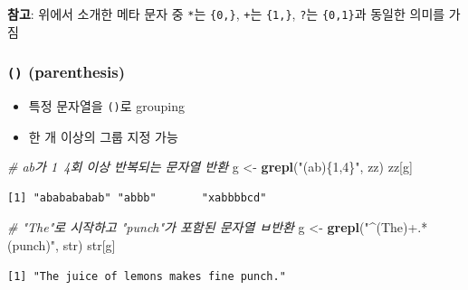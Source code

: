 \documentclass[
  11pt,
]{krantz}
\makeatletter
\newenvironment{Shaded}{\begin{snugshade}}{\end{snugshade}}
\newcommand{\CommentTok}[1]{\textcolor[rgb]{0.37,0.37,0.37}{\textit{#1}}}
\newcommand{\KeywordTok}[1]{\textcolor[rgb]{0.27,0.27,0.27}{\textbf{#1}}}
\newcommand{\NormalTok}[1]{#1}
\newcommand{\StringTok}[1]{\textcolor[rgb]{0.5,0.5,0.5}{#1}}
\providecommand{\tightlist}{%
  \setlength{\itemsep}{0pt}\setlength{\parskip}{0pt}}
\newenvironment{kframe}{%
\medskip{}
\setlength{\fboxsep}{.8em}
 \def\at@end@of@kframe{}%
 \ifinner\ifhmode%
  \def\at@end@of@kframe{\end{minipage}}%
  \begin{minipage}{\columnwidth}%
 \fi\fi%
 \def\FrameCommand##1{\hskip\@totalleftmargin \hskip-\fboxsep
 \colorbox{shadecolor}{##1}\hskip-\fboxsep
     \hskip-\linewidth \hskip-\@totalleftmargin \hskip\columnwidth}%
 \MakeFramed {\advance\hsize-\width
   \@totalleftmargin\z@ \linewidth\hsize
   \@setminipage}}%
 {\par\unskip\endMakeFramed%
 \at@end@of@kframe}
\newenvironment{rmdblock}[1]
  {
  \begin{itemize}
  \renewcommand{\labelitemi}{
    \raisebox{-.7\height}[0pt][0pt]{
      {\setkeys{Gin}{width=3em,keepaspectratio}\texttt{[image: images/\#1]}}
    }
  }
  \setlength{\fboxsep}{1em}
  \begin{kframe}
  \item
  }
  {
  \end{kframe}
  \end{itemize}
  }
\newenvironment{rmdnote}
  {\begin{rmdblock}{note}}
  {\end{rmdblock}}
\makeatother
\begin{document}
\normalsize

\footnotesize

\begin{rmdnote}
\begin{rmdnote}

\textbf{참고}: 위에서 소개한 메타 문자 중 \texttt{*}는 \texttt{\{0,\}}, \texttt{+}는 \texttt{\{1,\}}, \texttt{?}는 \texttt{\{0,1\}}과 동일한 의미를 가짐

\end{rmdnote}
\end{rmdnote}

\normalsize

\hypertarget{parenthesis}{%
\subsubsection*{\texorpdfstring{\textbf{\texttt{()} (parenthesis)}}{() (parenthesis)}}\label{parenthesis}}


\begin{itemize}
\tightlist
\item
  특정 문자열을 \texttt{()}로 grouping
\item
  한 개 이상의 그룹 지정 가능
\end{itemize}

\footnotesize

\begin{Shaded}
\begin{Highlighting}[]
\CommentTok{# ab가 1~4회 이상 반복되는 문자열 반환}
\NormalTok{g <-}\StringTok{ }\KeywordTok{grepl}\NormalTok{(}\StringTok{"(ab)\{1,4\}"}\NormalTok{, zz)}
\NormalTok{zz[g]}
\end{Highlighting}
\end{Shaded}

\begin{verbatim}
[1] "ababababab" "abbb"       "xabbbbcd"  
\end{verbatim}

\begin{Shaded}
\begin{Highlighting}[]
\CommentTok{# "The"로 시작하고  "punch"가 포함된 문자열 ㅂ반환}
\NormalTok{g <-}\StringTok{ }\KeywordTok{grepl}\NormalTok{(}\StringTok{"^(The)+.*(punch)"}\NormalTok{, str)}
\NormalTok{str[g]}
\end{Highlighting}
\end{Shaded}

\begin{verbatim}
[1] "The juice of lemons makes fine punch."
\end{verbatim}
\end{document}
